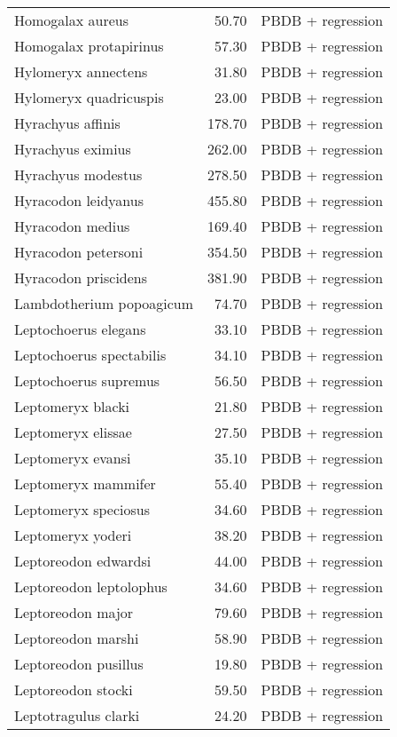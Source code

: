 \begin{table}[ht]
\begin{tabular}{lrl}
  Homogalax aureus & 50.70 & PBDB + regression \\ 
  Homogalax protapirinus & 57.30 & PBDB + regression \\ 
  Hylomeryx annectens & 31.80 & PBDB + regression \\ 
  Hylomeryx quadricuspis & 23.00 & PBDB + regression \\ 
  Hyrachyus affinis & 178.70 & PBDB + regression \\ 
  Hyrachyus eximius & 262.00 & PBDB + regression \\ 
  Hyrachyus modestus & 278.50 & PBDB + regression \\ 
  Hyracodon leidyanus & 455.80 & PBDB + regression \\ 
  Hyracodon medius & 169.40 & PBDB + regression \\ 
  Hyracodon petersoni & 354.50 & PBDB + regression \\ 
  Hyracodon priscidens & 381.90 & PBDB + regression \\ 
  Lambdotherium popoagicum & 74.70 & PBDB + regression \\ 
  Leptochoerus elegans & 33.10 & PBDB + regression \\ 
  Leptochoerus spectabilis & 34.10 & PBDB + regression \\ 
  Leptochoerus supremus & 56.50 & PBDB + regression \\ 
  Leptomeryx blacki & 21.80 & PBDB + regression \\ 
  Leptomeryx elissae & 27.50 & PBDB + regression \\ 
  Leptomeryx evansi & 35.10 & PBDB + regression \\ 
  Leptomeryx mammifer & 55.40 & PBDB + regression \\ 
  Leptomeryx speciosus & 34.60 & PBDB + regression \\ 
  Leptomeryx yoderi & 38.20 & PBDB + regression \\ 
  Leptoreodon edwardsi & 44.00 & PBDB + regression \\ 
  Leptoreodon leptolophus & 34.60 & PBDB + regression \\ 
  Leptoreodon major & 79.60 & PBDB + regression \\ 
  Leptoreodon marshi & 58.90 & PBDB + regression \\ 
  Leptoreodon pusillus & 19.80 & PBDB + regression \\ 
  Leptoreodon stocki & 59.50 & PBDB + regression \\ 
  Leptotragulus clarki & 24.20 & PBDB + regression \\ 

\end{tabular}
\end{table}

